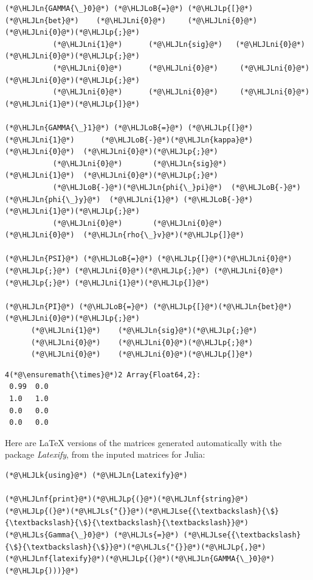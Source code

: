\documentclass[12pt,a4paper]{article}
\newcommand{\HLJLk}[1]{\textcolor[RGB]{148,91,176}{\textbf{#1}}}
\newcommand{\HLJLn}[1]{#1}
\newcommand{\HLJLnf}[1]{\textcolor[RGB]{66,102,213}{#1}}
\newcommand{\HLJLs}[1]{\textcolor[RGB]{201,61,57}{#1}}
\newcommand{\HLJLse}[1]{\textcolor[RGB]{59,151,46}{#1}}
\newcommand{\HLJLni}[1]{\textcolor[RGB]{59,151,46}{#1}}
\newcommand{\HLJLoB}[1]{\textcolor[RGB]{102,102,102}{\textbf{#1}}}
\newcommand{\HLJLp}[1]{#1}
\begin{document}
\begin{lstlisting}
(*@\HLJLn{GAMMA{\_}0}@*) (*@\HLJLoB{=}@*) (*@\HLJLp{[}@*)(*@\HLJLn{bet}@*)    (*@\HLJLni{0}@*)     (*@\HLJLni{0}@*)  (*@\HLJLni{0}@*)(*@\HLJLp{;}@*)
           (*@\HLJLni{1}@*)      (*@\HLJLn{sig}@*)   (*@\HLJLni{0}@*)  (*@\HLJLni{0}@*)(*@\HLJLp{;}@*)
           (*@\HLJLni{0}@*)      (*@\HLJLni{0}@*)     (*@\HLJLni{0}@*)  (*@\HLJLni{0}@*)(*@\HLJLp{;}@*)
           (*@\HLJLni{0}@*)      (*@\HLJLni{0}@*)     (*@\HLJLni{0}@*)  (*@\HLJLni{1}@*)(*@\HLJLp{]}@*)

(*@\HLJLn{GAMMA{\_}1}@*) (*@\HLJLoB{=}@*) (*@\HLJLp{[}@*)(*@\HLJLni{1}@*)      (*@\HLJLoB{-}@*)(*@\HLJLn{kappa}@*)  (*@\HLJLni{0}@*)  (*@\HLJLni{0}@*)(*@\HLJLp{;}@*)
           (*@\HLJLni{0}@*)       (*@\HLJLn{sig}@*)    (*@\HLJLni{1}@*)  (*@\HLJLni{0}@*)(*@\HLJLp{;}@*)
           (*@\HLJLoB{-}@*)(*@\HLJLn{phi{\_}pi}@*)  (*@\HLJLoB{-}@*)(*@\HLJLn{phi{\_}y}@*)  (*@\HLJLni{1}@*) (*@\HLJLoB{-}@*)(*@\HLJLni{1}@*)(*@\HLJLp{;}@*)
           (*@\HLJLni{0}@*)       (*@\HLJLni{0}@*)      (*@\HLJLni{0}@*)  (*@\HLJLn{rho{\_}v}@*)(*@\HLJLp{]}@*)

(*@\HLJLn{PSI}@*) (*@\HLJLoB{=}@*) (*@\HLJLp{[}@*)(*@\HLJLni{0}@*)(*@\HLJLp{;}@*) (*@\HLJLni{0}@*)(*@\HLJLp{;}@*) (*@\HLJLni{0}@*)(*@\HLJLp{;}@*) (*@\HLJLni{1}@*)(*@\HLJLp{]}@*)

(*@\HLJLn{PI}@*) (*@\HLJLoB{=}@*) (*@\HLJLp{[}@*)(*@\HLJLn{bet}@*)  (*@\HLJLni{0}@*)(*@\HLJLp{;}@*)
      (*@\HLJLni{1}@*)    (*@\HLJLn{sig}@*)(*@\HLJLp{;}@*)
      (*@\HLJLni{0}@*)    (*@\HLJLni{0}@*)(*@\HLJLp{;}@*)
      (*@\HLJLni{0}@*)    (*@\HLJLni{0}@*)(*@\HLJLp{]}@*)
\end{lstlisting}

\begin{lstlisting}
4(*@\ensuremath{\times}@*)2 Array{Float64,2}:
 0.99  0.0
 1.0   1.0
 0.0   0.0
 0.0   0.0
\end{lstlisting}


Here are LaTeX versions of the matrices generated automatically with the package \emph{Latexify}, from the inputed matrices for Julia:


\begin{lstlisting}
(*@\HLJLk{using}@*) (*@\HLJLn{Latexify}@*)

(*@\HLJLnf{print}@*)(*@\HLJLp{(}@*)(*@\HLJLnf{string}@*)(*@\HLJLp{(}@*)(*@\HLJLs{"{}}@*)(*@\HLJLse{{\textbackslash}{\$}{\textbackslash}{\$}{\textbackslash}{\textbackslash}}@*)(*@\HLJLs{Gamma{\_}0}@*) (*@\HLJLs{=}@*) (*@\HLJLse{{\textbackslash}{\$}{\textbackslash}{\$}}@*)(*@\HLJLs{"{}}@*)(*@\HLJLp{,}@*)(*@\HLJLnf{latexify}@*)(*@\HLJLp{(}@*)(*@\HLJLn{GAMMA{\_}0}@*)(*@\HLJLp{)))}@*)
\end{lstlisting}
\end{document}
